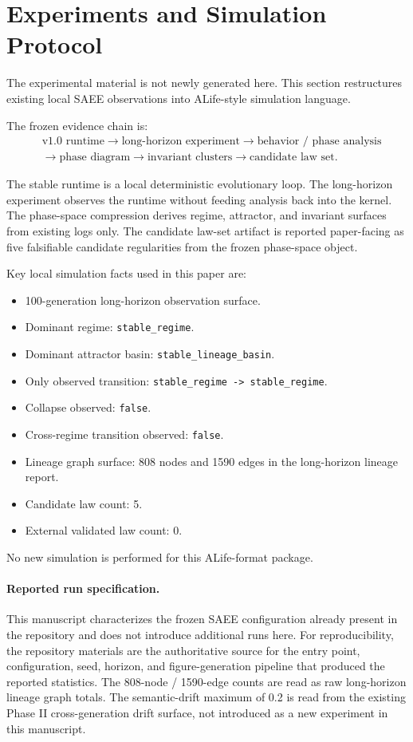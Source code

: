 \section{Experiments and Simulation Protocol}

The experimental material is not newly generated here. This section
restructures existing local SAEE observations into ALife-style simulation
language.

The frozen evidence chain is:
\[
\begin{aligned}
&\text{v1.0 runtime}
\rightarrow \text{long-horizon experiment}
\rightarrow \text{behavior / phase analysis}\\
&\rightarrow \text{phase diagram}
\rightarrow \text{invariant clusters}
\rightarrow \text{candidate law set}.
\end{aligned}
\]

The stable runtime is a local deterministic evolutionary loop. The
long-horizon experiment observes the runtime without feeding analysis back
into the kernel. The phase-space compression derives regime, attractor, and
invariant surfaces from existing logs only. The candidate law-set artifact is
reported paper-facing as five falsifiable candidate regularities from the
frozen phase-space object.

Key local simulation facts used in this paper are:
\begin{itemize}
  \item 100-generation long-horizon observation surface.
  \item Dominant regime: \texttt{stable\_regime}.
  \item Dominant attractor basin: \texttt{stable\_lineage\_basin}.
  \item Only observed transition: \texttt{stable\_regime -> stable\_regime}.
  \item Collapse observed: \texttt{false}.
  \item Cross-regime transition observed: \texttt{false}.
  \item Lineage graph surface: 808 nodes and 1590 edges in the long-horizon
    lineage report.
  \item Candidate law count: 5.
  \item External validated law count: 0.
\end{itemize}

No new simulation is performed for this ALife-format package.

\paragraph{Reported run specification.}
This manuscript characterizes the frozen SAEE configuration already present in
the repository and does not introduce additional runs here. For
reproducibility, the repository materials are the authoritative source for the
entry point, configuration, seed, horizon, and figure-generation pipeline that
produced the reported statistics. The 808-node / 1590-edge counts are read as
raw long-horizon lineage graph totals. The semantic-drift maximum of 0.2 is
read from the existing Phase II cross-generation drift surface, not introduced
as a new experiment in this manuscript.
